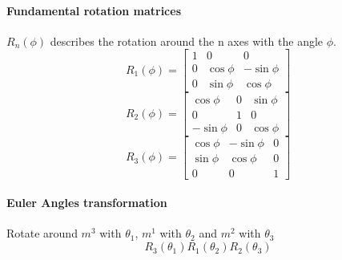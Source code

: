 \documentclass[12pt]{article}
\begin{document}
	\paragraph{Fundamental rotation matrices} $R_{n}(\phi)$ describes the rotation around the n axes with the angle $\phi$.\\
	\begin{equation}
	R_{1}(\phi) = 
	\begin{bmatrix}
	1 & 0 & 0\\
	0 & \cos \phi & -\sin \phi\\
	0 & \sin \phi & \cos \phi
	\end{bmatrix}
	\end{equation}
	\begin{equation}
	R_{2}(\phi) = 
	\begin{bmatrix}
	\cos \phi & 0 & \sin \phi\\
	0 & 1 & 0\\
	-\sin \phi & 0 & \cos \phi
	\end{bmatrix}
	\end{equation}
	\begin{equation}
	R_{3}(\phi) = 
	\begin{bmatrix}
	\cos \phi & -\sin \phi & 0\\
	\sin \phi & \cos \phi & 0\\
	0 & 0 & 1
	\end{bmatrix}
	\end{equation}
	
	\paragraph{Euler Angles transformation} Rotate around $m^3$ with $\theta_{1}$, $m^1$ with $\theta_{2}$ and $m^2$ with $\theta_{3}$ 
	\begin{equation}
	R_{3}(\theta_{1}) R_{1}(\theta_{2}) R_{2}(\theta_{3})
	\end{equation}
	
\end{document}
